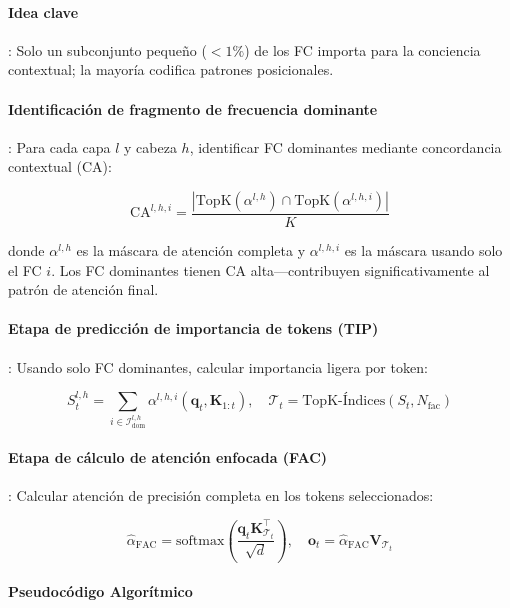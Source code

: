 \paragraph{Idea clave}: Solo un subconjunto pequeño ($ < 1\%$) de los FC importa para la conciencia contextual; la mayoría codifica patrones posicionales.

\paragraph{Identificación de fragmento de frecuencia dominante}: Para cada capa $l$ y cabeza $h$, identificar FC dominantes mediante concordancia contextual (CA):

\[
\text{CA}^{l,h,i} = \frac{|\text{TopK}(\alpha^{l,h}) \cap \text{TopK}(\alpha^{l,h,i})|}{K}
\]

donde $\alpha^{l,h}$ es la máscara de atención completa y $\alpha^{l,h,i}$ es la máscara usando solo el FC $i$. Los FC dominantes tienen CA alta---contribuyen significativamente al patrón de atención final.

\paragraph{Etapa de predicción de importancia de tokens (TIP)}: Usando solo FC dominantes, calcular importancia ligera por token:

\[
S_t^{l,h} = \sum_{i \in \mathcal{I}_{\text{dom}}^{l,h}} \alpha^{l,h,i}(\mathbf{q}_t, \mathbf{K}_{1:t}), \quad \mathcal{T}_t = \text{TopK-Índices}(S_t, N_{\text{fac}})
\]

\paragraph{Etapa de cálculo de atención enfocada (FAC)}: Calcular atención de precisión completa en los tokens seleccionados:

\[
\hat{\alpha}_{\text{FAC}} = \text{softmax}\left(\frac{\mathbf{q}_t \mathbf{K}_{\mathcal{T}_t}^\top}{\sqrt{d}}\right), \quad \mathbf{o}_t = \hat{\alpha}_{\text{FAC}} \mathbf{V}_{\mathcal{T}_t}
\]

\paragraph{Pseudocódigo Algorítmico}


